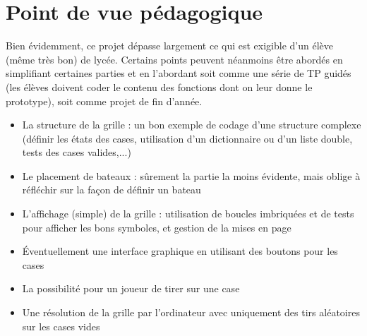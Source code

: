 \chapter{Point de vue pédagogique}

Bien évidemment, ce projet dépasse largement ce qui est exigible d'un élève (même très bon) de lycée. Certains points peuvent néanmoins être abordés en simplifiant certaines parties et en l'abordant soit comme une série de TP guidés (les élèves doivent coder le contenu des fonctions dont on leur donne le prototype), soit comme projet de fin d'année.
\begin{itemize}
\item La structure de la grille : un bon exemple de codage d'une structure complexe (définir les états des cases, utilisation d'un dictionnaire ou d'un liste double, tests des cases valides,...)
\item Le placement de bateaux : sûrement la partie la moins évidente, mais oblige à réfléchir sur la façon de définir un bateau 
\item L'affichage (simple) de la grille : utilisation de boucles imbriquées et de tests pour afficher les bons symboles, et gestion de la mises en page
\item Éventuellement une interface graphique en utilisant des boutons pour les cases
\item La possibilité pour un joueur de tirer sur une case
\item Une résolution de la grille par l'ordinateur avec uniquement des tirs aléatoires sur les cases vides
\end{itemize}

